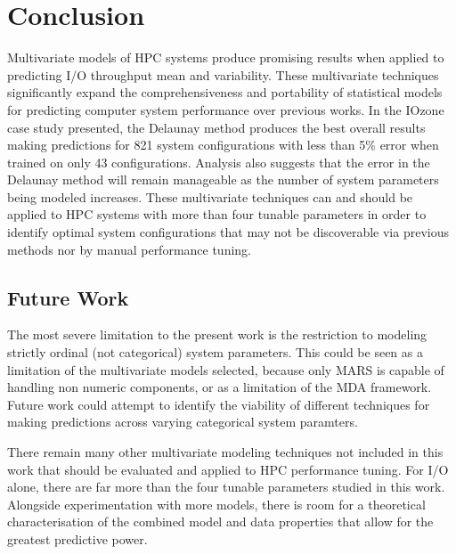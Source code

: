 \documentclass{scspaperproc}
\theoremstyle{scsthe}
\begin{document}

\section{Conclusion}
\label{sec:conclusion}
Multivariate models of HPC systems produce promising results when
applied to predicting I/O throughput mean and variability. These
multivariate techniques significantly expand the comprehensiveness and
portability of statistical models for predicting computer system
performance over previous works. In the IOzone case study presented,
the Delaunay method produces the best overall results making
predictions for 821 system configurations with less than 5\% error
when trained on only 43 configurations. Analysis also suggests that
the error in the Delaunay method will remain manageable as the number
of system parameters being modeled increases. These multivariate
techniques can and should be applied to HPC systems with more than
four tunable parameters in order to identify optimal system
configurations that may not be discoverable via previous methods nor
by manual performance tuning.

\subsection{Future Work}
The most severe limitation to the present work is the restriction to
modeling strictly ordinal (not categorical) system parameters. This
could be seen as a limitation of the multivariate models selected,
because only MARS is capable of handling non numeric components, or as
a limitation of the MDA framework. Future work could attempt to
identify the viability of different techniques for making predictions
across varying categorical system paramters.

There remain many other multivariate modeling techniques not included
in this work that should be evaluated and applied to HPC performance
tuning. For I/O alone, there are far more than the four tunable
parameters studied in this work. Alongside experimentation with more
models, there is room for a theoretical characterisation of the
combined model and data properties that allow for the greatest
predictive power.







\end{document}
